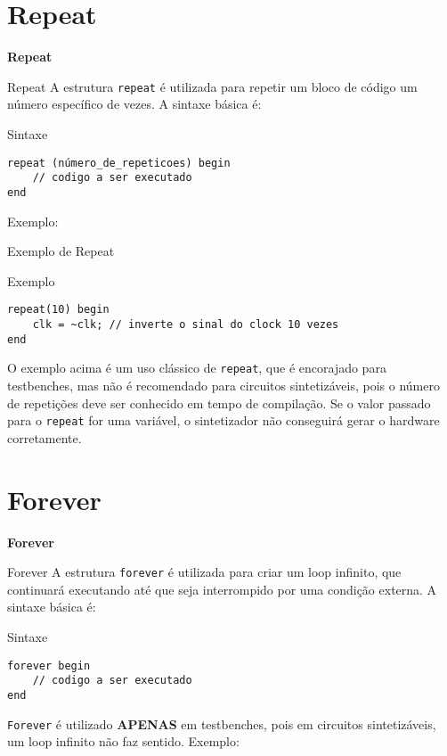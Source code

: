\documentclass[aspectratio=169,xcolor=dvipsnames]{beamer}
\begin{document}
\section{Repeat}

\begin{frame}
    \Huge{\centerline{\textbf{Repeat}}}
\end{frame}

\begin{frame}[fragile]{Repeat}
A estrutura \texttt{repeat} é utilizada para repetir um bloco de código um número específico de vezes. A sintaxe básica é:

\begin{block}{Sintaxe}
\begin{verbatim}
repeat (número_de_repeticoes) begin
    // codigo a ser executado
end
\end{verbatim}
\end{block}

Exemplo:
\end{frame}

\begin{frame}[fragile]{Exemplo de Repeat}
\begin{block}{Exemplo}
\begin{verbatim}
repeat(10) begin
    clk = ~clk; // inverte o sinal do clock 10 vezes
end
\end{verbatim}
\end{block}

O exemplo acima é um uso clássico de \texttt{repeat}, que é encorajado para testbenches, mas não é recomendado para circuitos sintetizáveis, pois o número de repetições deve ser conhecido em tempo de compilação. Se o valor passado para o \texttt{repeat} for uma variável, o sintetizador não conseguirá gerar o hardware corretamente.
\end{frame}

\section{Forever}

\begin{frame}
    \Huge{\centerline{\textbf{Forever}}}
\end{frame}

\begin{frame}[fragile]{Forever}
A estrutura \texttt{forever} é utilizada para criar um loop infinito, que continuará executando até que seja interrompido por uma condição externa. A sintaxe básica é:

\begin{block}{Sintaxe}
\begin{verbatim}
forever begin
    // codigo a ser executado
end
\end{verbatim}
\end{block}

\texttt{Forever} é utilizado \textbf{APENAS} em testbenches, pois em circuitos sintetizáveis, um loop infinito não faz sentido. Exemplo:
\end{frame}
\end{document}
